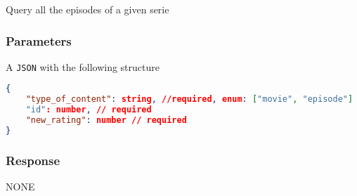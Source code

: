 \documentclass{article}
\newcommand{\mono}{\texttt}
\begin{document}
Query all the episodes of a given serie

\subsubsection{Parameters}
A \mono{JSON} with the following structure

\begin{lstlisting}[language=json]
{
	"type_of_content": string, //required, enum: ["movie", "episode"]
	"id": number, // required
	"new_rating": number // required
}
\end{lstlisting}

\subsubsection{Response}
NONE
\end{document}
